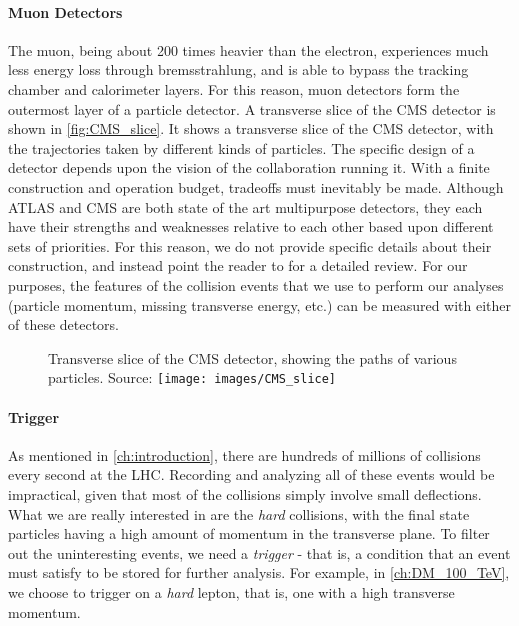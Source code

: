 \paragraph{Muon Detectors} The muon, being about 200 times heavier than the electron, experiences much less energy loss through bremsstrahlung, and is able to bypass the tracking chamber and calorimeter layers. For this reason, muon detectors form the outermost layer of a particle detector.
A transverse slice of the CMS detector is shown in \autoref{fig:CMS_slice}. It shows a transverse slice of the CMS detector, with the trajectories taken by different kinds of particles.
The specific design of a detector depends upon the vision of the collaboration running it. With a finite construction and operation budget, tradeoffs must inevitably be made. Although ATLAS and CMS are both state of the art multipurpose detectors, they each have their strengths and weaknesses relative to each other based upon different sets of priorities. For this reason, we do not provide specific details about their construction, and instead point the reader to \citep{Froidevaux2006} for a detailed review.
For our purposes, the features of the collision events that we use to perform our analyses (particle momentum, missing transverse energy, etc.) can be measured with either of these detectors.
\begin{figure}[h]
  \begin{sidecaption}
    {Transverse slice of the CMS detector, showing the paths of various particles. Source: \citep{CMS_Slice}}
    \centering
    \texttt{[image: images/CMS\_slice]}
  \end{sidecaption}
  \label{fig:CMS_slice}
\end{figure}
\paragraph{Trigger} As mentioned in \autoref{ch:introduction}, there are hundreds of millions of collisions every second at the LHC. Recording and analyzing all of these events would be impractical, given that most of the collisions simply involve small deflections. What we are really interested in are the \emph{hard} collisions, with the final state particles having a high amount of momentum in the transverse plane. To filter out the uninteresting events, we need a \emph{trigger} - that is, a condition that an event must satisfy to be stored for further analysis. For example, in \autoref{ch:DM_100_TeV}, we choose to trigger on a \emph{hard} lepton, that is, one with a high transverse momentum.
